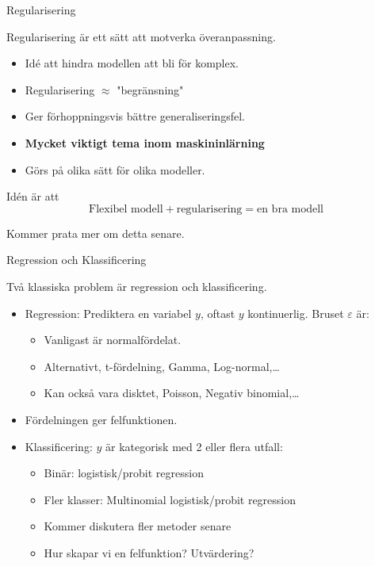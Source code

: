 \documentclass[10pt,english]{beamer}
\begin{document}
\begin{frame}{Regularisering}

    Regularisering är ett sätt att motverka överanpassning.

    \begin{itemize}
        \item Idé att hindra modellen att bli för komplex.
        \item Regularisering $\approx$ "begränsning"
        \item Ger förhoppningsvis bättre generaliseringsfel.
        \item \textbf{Mycket viktigt tema inom maskininlärning}
        \item Görs på olika sätt för olika modeller.
    \end{itemize}

    Idén är att
    \begin{equation*}
        \text{Flexibel modell} + \text{regularisering} = \text{en bra modell}
    \end{equation*}

    Kommer prata mer om detta senare.

\end{frame}

\begin{frame}{Regression och Klassificering}
    
    Två klassiska problem är regression och klassificering.

    \begin{itemize}
        \item Regression: Prediktera en variabel $y$, oftast $y$ kontinuerlig. Bruset $\varepsilon$ är:
        \begin{itemize}
            \item Vanligast är normalfördelat.
            \item Alternativt, t-fördelning, Gamma, Log-normal,\dots
            \item Kan också vara disktet, Poisson, Negativ binomial,\dots
        \end{itemize}
        \item Fördelningen ger felfunktionen.
        \item Klassificering: $y$ är kategorisk med 2 eller flera utfall:
        \begin{itemize}
            \item Binär: logistisk/probit regression
            \item Fler klasser: Multinomial logistisk/probit regression
            \item Kommer diskutera fler metoder senare
            \item Hur skapar vi en felfunktion? Utvärdering?
        \end{itemize}
    \end{itemize}

\end{frame}
\end{document}
